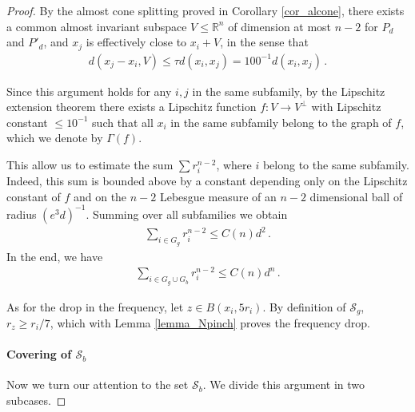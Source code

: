 \documentclass[11pt]{article}
\begin{document}
\begin{proof}
By the almost cone splitting proved in Corollary \ref{cor_alcone}, there exists a common almost invariant subspace $V\leq {\mathbb{R}}^n$ of dimension at most $n-2$ for $P_d$ and $P'_d$, and $x_j$ is effectively close to $x_i+V$, in the sense that
\begin{gather}
 d(x_j-x_i,V) \leq \tau d(x_i,x_j)=100^{-1} d(x_i,x_j)\, .
\end{gather}

Since this argument holds for any $i,j$ in the same subfamily, by the Lipschitz extension theorem there exists a Lipschitz function $f:V\to V^\perp$ with Lipschitz constant $\leq 10^{-1}$ such that all $x_i$ in the same subfamily belong to the graph of $f$, which we denote by $\Gamma(f)$.

This allow us to estimate the sum $\sum r_i^{n-2}$, where $i$ belong to the same subfamily. Indeed, this sum is bounded above by a constant depending only on the Lipschitz constant of $f$ and on the $n-2$ Lebesgue measure of an $n-2$ dimensional ball of radius $(e^3d)^{-1}$. Summing over all subfamilies we obtain
\begin{gather}
 \sum_{i\in G_g} r_i^{n-2}\leq C(n) d^2\, .
\end{gather}
In the end, we have
\begin{gather}
 \sum_{i\in G_g\cup G_b} r_i^{n-2} \leq C(n) d^n\, .
\end{gather}

As for the drop in the frequency, let $z\in B(x_i,5 r_i)$. By definition of ${\mathcal{S}}_g$, $r_z\geq r_i/7$, which with Lemma \ref{lemma_Npinch} proves the frequency drop.

\paragraph{Covering of ${\mathcal{S}}_b$} Now we turn our attention to the set ${\mathcal{S}}_b$. We divide this argument in two subcases.


\end{proof}
\end{document}
